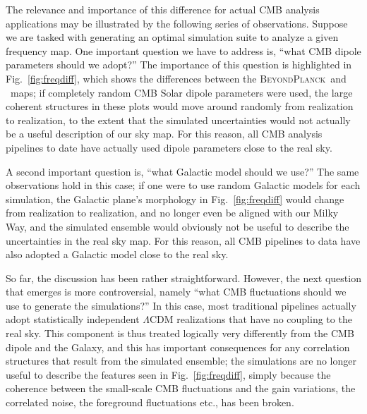 \documentclass[twocolumn]{aa}
\newcommand{\BP}{\textsc{BeyondPlanck}}
\begin{document}
The relevance and importance of this difference for actual CMB
analysis applications may be illustrated by the following series of
observations. Suppose we are tasked with generating an optimal
simulation suite to analyze a given frequency map. One important
question we have to address is, ``what CMB dipole parameters should we
adopt?'' The importance of this question is highlighted in
Fig.~\ref{fig:freqdiff}, which shows the differences between the
\BP\ and \Planck\ maps; if completely random CMB Solar dipole
parameters were used, the large coherent structures in these plots
would move around randomly from realization to realization, to the
extent that the simulated uncertainties would not actually be a useful
description of our sky map. For this reason, all CMB analysis
pipelines to date have actually used dipole parameters close to the
real sky.

A second important question is, ``what Galactic model should we use?''
The same observations hold in this case; if one were to use random
Galactic models for each simulation, the Galactic plane's morphology
in Fig.~\ref{fig:freqdiff} would change from realization to
realization, and no longer even be aligned with our Milky Way, and the
simulated ensemble would obviously not be useful to describe the
uncertainties in the real sky map. For this reason, all CMB pipelines
to data have also adopted a Galactic model close to the real sky.

So far, the discussion has been rather straightforward. However, the
next question that emerges is more controversial, namely ``what CMB
fluctuations should we use to generate the simulations?'' In this
case, most traditional pipelines actually adopt statistically
independent $\Lambda$CDM realizations that have no coupling to the real
sky. This component is thus treated logically very differently from
the CMB dipole and the Galaxy, and this has important consequences for
any correlation structures that result from the simulated
ensemble; the simulations are no longer useful to describe the
features seen in Fig.~\ref{fig:freqdiff}, simply because the
coherence between the small-scale CMB fluctuations and the gain
variations, the correlated noise, the foreground fluctuations etc.,
has been broken.
\end{document}
